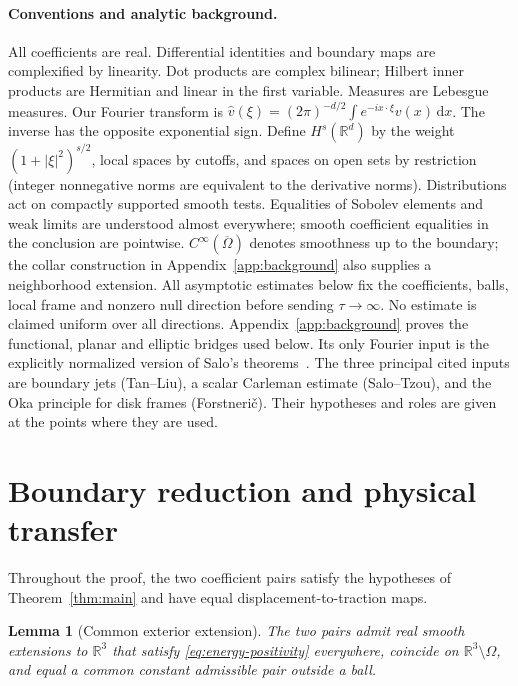 \documentclass[11pt]{article}
\newcommand{\R}{\mathbb R}
\newcommand{\dd}{\mathrm d}
\newtheorem{lemma}[theorem]{Lemma}
\theoremstyle{remark}
\numberwithin{equation}{section}
\begin{document}
\paragraph{Conventions and analytic background.}
All coefficients are real. Differential identities and boundary maps are
complexified by linearity. Dot products are complex bilinear; Hilbert inner
products are Hermitian and linear in the first variable. Measures are Lebesgue
measures. Our Fourier transform is
$\widehat v(\xi)=(2\pi)^{-d/2}\int e^{-ix\cdot\xi}v(x)\,\dd x$.
The inverse has the opposite exponential sign. Define $H^s(\R^d)$ by the
weight $(1+|\xi|^2)^{s/2}$, local spaces by cutoffs, and spaces on open sets
by restriction (integer nonnegative norms are equivalent to the derivative
norms). Distributions act on compactly supported smooth tests. Equalities of
Sobolev elements and weak limits are understood almost everywhere; smooth
coefficient equalities in the conclusion are pointwise. $C^\infty(\overline
\Omega)$ denotes smoothness up to the boundary; the collar construction in
Appendix~\ref{app:background} also supplies a neighborhood extension.
All asymptotic estimates below fix the coefficients, balls, local frame and
nonzero null direction before sending $\tau\to\infty$. No estimate is claimed
uniform over all directions. Appendix~\ref{app:background} proves the
functional, planar and elliptic bridges used below. Its only Fourier input is
the explicitly normalized version of Salo's theorems~\cite{SaloFourier2013}.
The three principal cited inputs are boundary jets
(Tan--Liu), a scalar Carleman estimate (Salo--Tzou), and the Oka principle
for disk frames (Forstneri\v c). Their hypotheses and roles are given at
the points where they are used.
\section{Boundary reduction and physical transfer}\label{sec:boundary-reduction}

Throughout the proof, the two coefficient pairs satisfy the hypotheses
of Theorem~\ref{thm:main} and have equal displacement-to-traction maps.

\begin{lemma}[Common exterior extension]\label{lem:common-extension}
The two pairs admit real smooth extensions to $\R^3$ that satisfy
\eqref{eq:energy-positivity} everywhere, coincide on
$\R^3\setminus\Omega$, and equal a common constant admissible pair
outside a ball.
\end{lemma}
\end{document}
